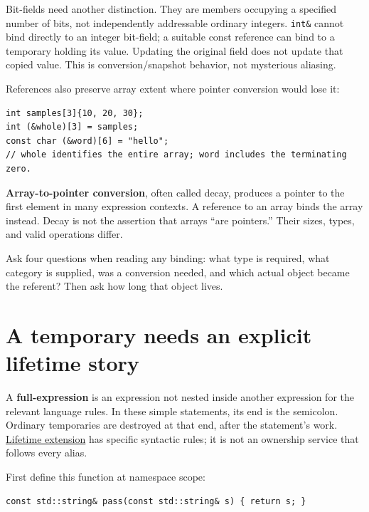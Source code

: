 Bit-fields need another distinction. They are members occupying a specified number of bits, not independently addressable ordinary integers. \texttt{int\&} cannot bind directly to an integer bit-field; a suitable const reference can bind to a temporary holding its value. Updating the original field does not update that copied value. This is conversion/snapshot behavior, not mysterious aliasing.

References also preserve array extent where pointer conversion would lose it:

\begin{verbatim}
int samples[3]{10, 20, 30};
int (&whole)[3] = samples;
const char (&word)[6] = "hello";
// whole identifies the entire array; word includes the terminating zero.
\end{verbatim}

\textbf{Array-to-pointer conversion}, often called decay, produces a pointer to the first element in many expression contexts. A reference to an array binds the array instead. Decay is not the assertion that arrays ``are pointers.'' Their sizes, types, and valid operations differ.

Ask four questions when reading any binding: what type is required, what category is supplied, was a conversion needed, and which actual object became the referent? Then ask how long that object lives.

\section{A temporary needs an explicit lifetime story}\label{01-foundations-i-ch003-a-temporary-needs-an-explicit-lifetime-story}

\hypertarget{01-foundations-i-ch003-a-temporary-needs-an-explicit-lifetime-story}{}

A \textbf{full-expression} is an expression not nested inside another expression for the relevant language rules. In these simple statements, its end is the semicolon. Ordinary temporaries are destroyed at that end, after the statement's work. \hyperref[appendix-a978b29bbbb0]{Lifetime extension} has specific syntactic rules; it is not an ownership service that follows every alias.

First define this function at namespace scope:

\begin{verbatim}
const std::string& pass(const std::string& s) { return s; }
\end{verbatim}


